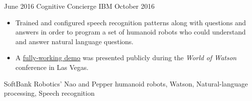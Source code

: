 \begin{projects}


    \project
        {June 2016}
        {Cognitive Concierge}
        {IBM}
        {October 2016}
        {
            \begin{itemize}
                \item Trained and configured speech recognition 
                    patterns along with questions and answers in order to 
                    program a set of humanoid robots who could understand and 
                    answer natural language questions.
                \item A \href{https://www.youtube.com/watch?v=yC0EOEdedzQ}
                    {\underline{fully-working demo}} was presented publicly 
                    during the \textit{World of Watson} conference in Las Vegas.
            \end{itemize}
        }
        {
            SoftBank Robotics' Nao and Pepper humanoid robots,
            Watson,
            Natural-language processing,
            Speech recognition
        }


\end{projects}
